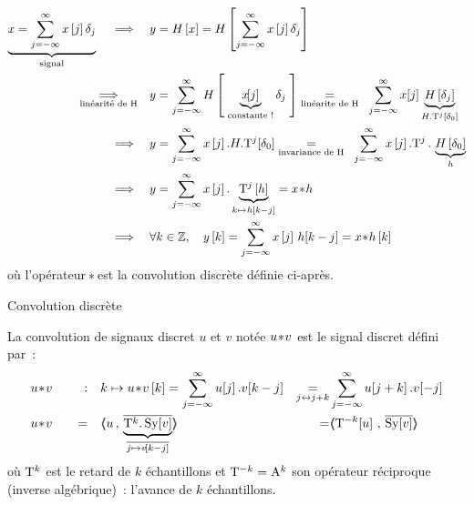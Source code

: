 \begin{align}
  \label{eq:reponse_convolution}
  \caCest{x = \somme{j=-\infty}{\infty}{x\b{j}\delta_{j}}}{\text{signal}}\quad \implies\quad &y=H\b{x}=H\b{\somme{j=-\infty}{\infty}{x\b{j}\delta_{j}}} \nonumber\\
  \underset{\text{linéarité de H}}{\implies}\quad &y=\somme{j=-\infty}{\infty}{H\b{ \;\caCest{x\!\!\b{j}}{\text{constante !}}\delta_{j}\;}} \underset{\text{linéarite de H}}{=} \;\;\somme{j=-\infty}{\infty}{x\!\b{j}\caCest{H\b{\delta_j}}{H.\oret^j\b{\delta_0}}} \nonumber \\
  \implies \quad &y=\somme{j=-\infty}{\infty}{x\b{j}.H.\oret^j\!\b{\delta_{0}}} \underset{\text{invariance de H}}{=} \;\;\somme{j=-\infty}{\infty}{x\b{j}.\oret^j\,.\,\caCest{H\b{\delta_{0}}}{h}}\nonumber\\
  \implies \quad & y= \somme{j=-\infty}{\infty}{x\b{j}.\caCest{\oret^j\b{h}}{k\mapsto h\b{k-j}}}=x\conv h \nonumber\\
  \implies \quad & \forall k\in\Z,\quad  y\b{k}= \somme{j=-\infty}{\infty}{x\b{j}\,h\!\b{k-j}} = x\conv h\b{k}
\end{align}
où l'opérateur $\!\ast\!$ est la convolution discrète définie ci-après.

\begin{definition}{Convolution discrète}
  \label{def:convolution_discrete}
  
  La convolution de signaux discret $u$ et $v$ notée $u\!\ast\! v$ est le
  signal discret défini par~:
  \begin{align}
    \label{eq:convolution_discrete}
    &u\conv v \quad &:& \quad k \mapsto u\conv v\b{k} =\somme{j=-\infty}{\infty}{u\ded{j}.v\ded{k-j}} &\underset{j\leftrightarrow j+k}{=}&  \somme{j=-\infty}{\infty}{u\ded{j+k}.v\ded{-j}} \nonumber\\
    &u\conv v \quad & = &\quad\scald{u}{\caCest{\conj{\oret^k.\,\Sy\ded{v}}}{\conj{j\mapsto v\ded{k-j}}}} &=& \scald{\oret^{-k}\ded{u}}{\conj{\Sy\ded{v}}} 
  \end{align}
  où $\mathrm{T}^k$ est le retard de $k$ échantillons et
  $\mathrm{T}^{-k}=\mathrm{A}^k$ son opérateur réciproque (inverse
  algébrique)~: l'avance de $k$ échantillons.
\end{definition}

